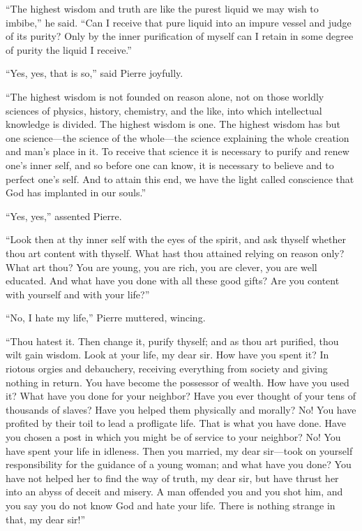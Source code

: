 ``The highest wisdom and truth are like the purest liquid we may
wish to imbibe,'' he said. ``Can I receive that pure liquid into
an impure vessel and judge of its purity? Only by the inner
purification of myself can I retain in some degree of purity the
liquid I receive.''

``Yes, yes, that is so,'' said Pierre joyfully.

``The highest wisdom is not founded on reason alone, not on those
worldly sciences of physics, history, chemistry, and the like,
into which intellectual knowledge is divided. The highest wisdom
is one. The highest wisdom has but one science---the science of
the whole---the science explaining the whole creation and man's
place in it. To receive that science it is necessary to purify
and renew one's inner self, and so before one can know, it is
necessary to believe and to perfect one's self. And to attain
this end, we have the light called conscience that God has
implanted in our souls.''

``Yes, yes,'' assented Pierre.

``Look then at thy inner self with the eyes of the spirit, and
ask thyself whether thou art content with thyself. What hast thou
attained relying on reason only? What art thou? You are young,
you are rich, you are clever, you are well educated. And what
have you done with all these good gifts? Are you content with
yourself and with your life?''

``No, I hate my life,'' Pierre muttered, wincing.

``Thou hatest it. Then change it, purify thyself; and as thou art
purified, thou wilt gain wisdom. Look at your life, my dear
sir. How have you spent it? In riotous orgies and debauchery,
receiving everything from society and giving nothing in
return. You have become the possessor of wealth. How have you
used it? What have you done for your neighbor? Have you ever
thought of your tens of thousands of slaves? Have you helped them
physically and morally? No! You have profited by their toil to
lead a profligate life. That is what you have done. Have you
chosen a post in which you might be of service to your neighbor?
No! You have spent your life in idleness. Then you married, my
dear sir---took on yourself responsibility for the guidance of a
young woman; and what have you done? You have not helped her to
find the way of truth, my dear sir, but have thrust her into an
abyss of deceit and misery. A man offended you and you shot him,
and you say you do not know God and hate your life. There is
nothing strange in that, my dear sir!''

